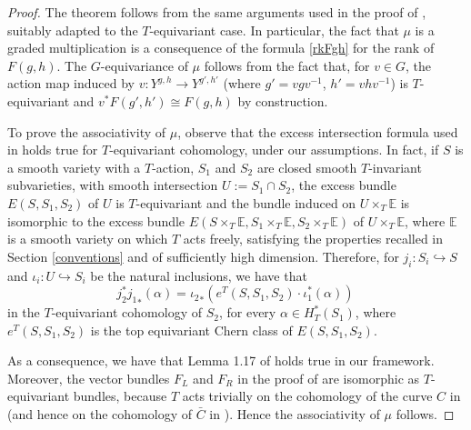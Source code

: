 \documentclass[10pt,a4paper]{amsart}
\newcommand{\E}{\mathbb{E}}
\newcommand{\1}{\mathds{1}}   %
\begin{document}
\begin{proof}
The theorem follows from the same arguments used in the proof of \cite[Theorem 1.18]{FG03}, suitably adapted
to the $T$-equivariant case.
In particular, the fact that $\mu$ is a graded multiplication is a consequence of the formula \eqref{rkFgh} for the rank of $F(g,h)$.
The $G$-equivariance of $\mu$ follows from the fact that, for $v\in G$, the action map induced by 
$v\colon Y^{g, h} \to Y^{g', h'}$
(where $g'= vgv^{-1}$, $h'= vhv^{-1}$) is $T$-equivariant and $v^* F(g', h') \cong F(g, h)$ by construction. 

To prove the associativity of $\mu$, observe that the excess intersection formula used in \cite{FG03}
holds true for $T$-equivariant cohomology, under our assumptions. In fact, if $S$ is a smooth variety with a $T$-action, 
$S_1$ and $S_2$ are closed smooth $T$-invariant subvarieties, with smooth intersection $U:=S_1 \cap S_2$,   
the excess bundle $E(S, S_1, S_2)$ of $U$ is $T$-equivariant and the bundle induced on $U\times_T \E$
is isomorphic to the excess bundle $E(S\times_T \E, S_1\times_T \E, S_2 \times_T \E)$ of $U\times_T \E$,
where $\E$ is a smooth variety on which $T$ acts freely, satisfying the properties recalled in Section \ref{conventions}
and of sufficiently high dimension. Therefore, for $j_i \colon S_i \hookrightarrow S$
and $\iota_i \colon U \hookrightarrow S_i$ be the natural inclusions, we have that
$$
j_2^*{j_1}_* (\alpha) = {\iota_2}_* \left( e^T(S, S_1, S_2) \cdot \iota_1^*(\alpha) \right) \, 
$$
in the $T$-equivariant cohomology of $S_2$, for every  $\alpha \in H^*_T(S_1)$, where $e^T(S, S_1, S_2)$ is the top equivariant Chern class of $E(S, S_1, S_2)$. 

As a consequence, we have that  Lemma 1.17 of \cite{FG03} holds true in our framework.
Moreover, the vector bundles $F_L$ and $F_R$ in the proof of \cite[Thm. 1.18]{FG03} are isomorphic 
as $T$-equivariant bundles, because $T$ acts trivially on the cohomology of the curve $C$ in \cite[Construction 1.21]{FG03}
(and hence on the cohomology of $\bar{C}$ in \cite[Rem. 1.24]{FG03}). Hence the associativity of $\mu$ follows.
\end{proof}
\end{document}
